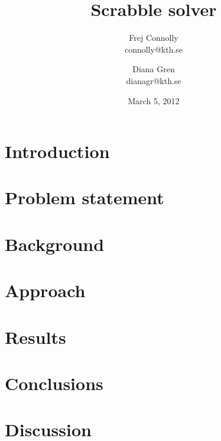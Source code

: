 \documentclass[a4paper, 12pt]{report}
\begin{document}
\title{Scrabble solver}
\date{March 5, 2012}
\author{Frej Connolly \\ connolly@kth.se
        \and Diana Gren \\ dianagr@kth.se}

\maketitle
\tableofcontents


\chapter{Introduction}

\chapter{Problem statement}
\chapter{Background}
\chapter{Approach}


\chapter{Results}
\chapter{Conclusions}
\chapter{Discussion}
\end{document}
